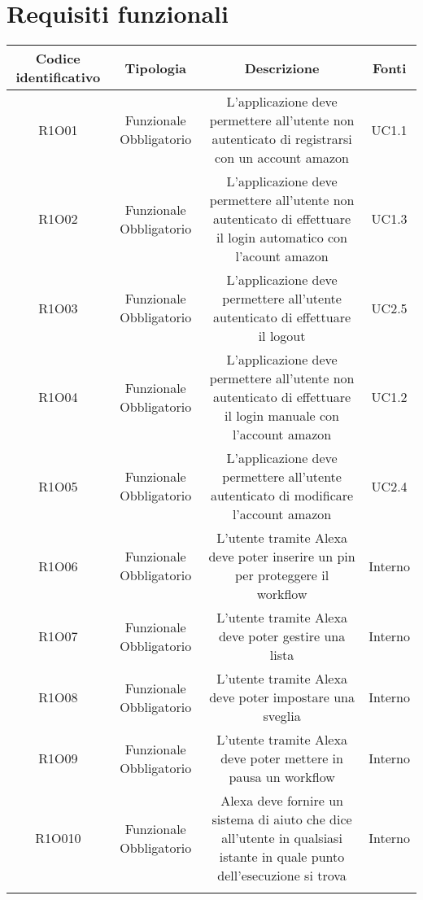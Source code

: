 \section{Requisiti funzionali}
\begin{tabularx}{\textwidth}{|C|C|C|C|}
	\hline
     \textbf{Codice identificativo} & \textbf{Tipologia} & \textbf{Descrizione} & \textbf{Fonti} \\
    \hline
	\endhead
	R1O01& Funzionale Obbligatorio &L'applicazione deve permettere all'utente non autenticato di registrarsi con un account amazon& UC1.1	\\
	\hline
	R1O02& Funzionale Obbligatorio &L'applicazione deve permettere all'utente non autenticato di effettuare il login automatico con l'acount amazon & UC1.3\\
	\hline
	R1O03& Funzionale Obbligatorio &L'applicazione deve permettere all'utente autenticato di  effettuare il logout & UC2.5\\
	\hline
	R1O04& Funzionale Obbligatorio &L'applicazione deve permettere all'utente non autenticato di effettuare il login manuale con l'account amazon& UC1.2\\
	\hline
	R1O05& Funzionale Obbligatorio&L'applicazione deve permettere all'utente autenticato di modificare l'account amazon& UC2.4\\
	\hline
	R1O06& Funzionale Obbligatorio&L'utente tramite Alexa deve poter inserire un pin per proteggere il workflow & Interno \\
	\hline
	R1O07&Funzionale Obbligatorio & L'utente tramite Alexa deve poter gestire una lista& Interno\\
	\hline
	R1O08&Funzionale Obbligatorio &L'utente tramite Alexa deve poter impostare una sveglia &Interno\\
	\hline
	R1O09&Funzionale Obbligatorio  &L'utente tramite Alexa deve poter mettere in pausa un workflow &Interno \\
	\hline
	R1O010&Funzionale Obbligatorio&Alexa deve fornire un sistema di aiuto che dice all'utente in qualsiasi istante in quale punto dell'esecuzione si trova & Interno\\
	\hline
	\caption{Tabella requisiti funzionali}
\end{tabularx}



